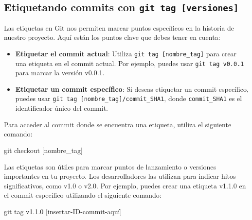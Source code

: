 \documentclass[
  letterpaper,
  DIV=11,
  numbers=noendperiod]{scrartcl}
\newenvironment{Shaded}{}{}
\newcommand{\FunctionTok}[1]{\textcolor[rgb]{0.44,0.26,0.76}{#1}}
\newcommand{\NormalTok}[1]{\textcolor[rgb]{0.14,0.16,0.18}{#1}}
\newcommand{\PreprocessorTok}[1]{\textcolor[rgb]{0.84,0.23,0.29}{#1}}
\newcommand{\SpecialStringTok}[1]{\textcolor[rgb]{0.01,0.18,0.38}{#1}}
\begin{document}
\hypertarget{etiquetando-commits-con-git-tag-versiones}{%
\subsection{\texorpdfstring{Etiquetando commits con
\texttt{git\ tag\ {[}versiones{]}}}{Etiquetando commits con git tag {[}versiones{]}}}\label{etiquetando-commits-con-git-tag-versiones}}

Las etiquetas en Git nos permiten marcar puntos específicos en la
historia de nuestro proyecto. Aquí están los puntos clave que debes
tener en cuenta:

\begin{itemize}
\item
  \textbf{Etiquetar el commit actual}: Utiliza
  \texttt{git\ tag\ {[}nombre\_tag{]}} para crear una etiqueta en el
  commit actual. Por ejemplo, puedes usar \texttt{git\ tag\ v0.0.1} para
  marcar la versión v0.0.1.
\item
  \textbf{Etiquetar un commit específico}: Si deseas etiquetar un commit
  específico, puedes usar
  \texttt{git\ tag\ {[}nombre\_tag{]}/commit\_SHA1}, donde
  \texttt{commit\_SHA1} es el identificador único del commit.
\end{itemize}

Para acceder al commit donde se encuentra una etiqueta, utiliza el
siguiente comando:

\begin{Shaded}
\begin{Highlighting}[]
\FunctionTok{git}\NormalTok{ checkout }\PreprocessorTok{[}\SpecialStringTok{nombre\_tag}\PreprocessorTok{]}
\end{Highlighting}
\end{Shaded}

Las etiquetas son útiles para marcar puntos de lanzamiento o versiones
importantes en tu proyecto. Los desarrolladores las utilizan para
indicar hitos significativos, como v1.0 o v2.0. Por ejemplo, puedes
crear una etiqueta v1.1.0 en el commit específico utilizando el
siguiente comando:

\begin{Shaded}
\begin{Highlighting}[]
\FunctionTok{git}\NormalTok{ tag v1.1.0 }\PreprocessorTok{[}\SpecialStringTok{insertar}\PreprocessorTok{{-}}\SpecialStringTok{ID}\PreprocessorTok{{-}}\SpecialStringTok{commit}\PreprocessorTok{{-}}\SpecialStringTok{aquí}\PreprocessorTok{]}
\end{Highlighting}
\end{Shaded}
\end{document}
